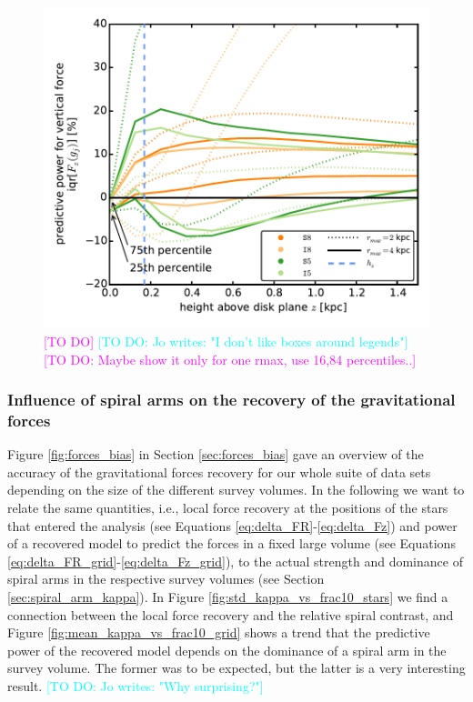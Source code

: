 \documentclass[iop,revtex4,numberedappendix,appendixfloats]{emulateapj}
\newcommand{\Wilma}[1]{\textcolor{Magenta}{#1}}
\newcommand{\Jo}[1]{\textcolor{Cyan}{#1}}
\begin{document}
\begin{figure}[!htbp]
\centering
\includegraphics[width=\columnwidth]{fig/MNdHHdiffSph2_Fg_vs_z.pdf}
\caption{\Wilma{[TO DO]} \Jo{[TO DO: Jo writes: "I don't like boxes around legends"]} \Wilma{[TO DO: Maybe show it only for one rmax, use 16,84 percentiles..]}}
\label{fig:??}
\end{figure}


\subsubsection{Influence of spiral arms on the recovery of the gravitational forces} \label{sec:spiral_arms_and_forces}

Figure \ref{fig:forces_bias} in Section \ref{sec:forces_bias} gave an overview of the accuracy of the gravitational forces recovery for our whole suite of data sets depending on the size of the different survey volumes. In the following we want to relate the same quantities, i.e., local force recovery at the positions of the stars that entered the analysis (see Equations \eqref{eq:delta_FR}-\eqref{eq:delta_Fz}) and power of a recovered model to predict the forces in a fixed large volume (see Equations \eqref{eq:delta_FR_grid}-\eqref{eq:delta_Fz_grid}), to the actual strength and dominance of spiral arms in the respective survey volumes (see Section \ref{sec:spiral_arm_kappa}). In Figure \ref{fig:std_kappa_vs_frac10_stars} we find a connection between the local force recovery and the relative spiral contrast, and Figure \ref{fig:mean_kappa_vs_frac10_grid} shows a trend that the predictive power of the recovered model depends on the dominance of a spiral arm in the survey volume. The former was to be expected, but the latter is a very interesting result. \Jo{[TO DO: Jo writes: "Why surprising?"]}
\end{document}
